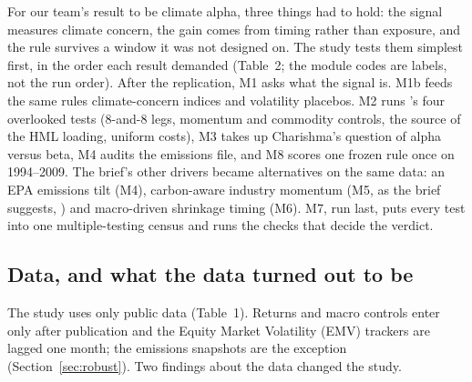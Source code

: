 For our team's result to be climate alpha, three things had to hold: the signal measures climate concern, the gain comes from timing rather than exposure, and the rule survives a window it was not designed on. The study tests them simplest first, in the order each result demanded (Table~2; the module codes are labels, not the run order). After the replication, M1 asks what the signal is. M1b feeds the same rules climate-concern indices and volatility placebos. M2 runs \CR's four overlooked tests (8-and-8 legs, momentum and commodity controls, the source of the HML loading, uniform costs), M3 takes up Charishma's question of alpha versus beta, M4 audits the emissions file, and M8 scores one frozen rule once on 1994--2009. The brief's other drivers became alternatives on the same data: an EPA emissions tilt (M4), carbon-aware industry momentum (M5, as the brief suggests, \citealp{za2024}) and macro-driven shrinkage timing (M6). M7, run last, puts every test into one multiple-testing census and runs the checks that decide the verdict.

\subsection{Data, and what the data turned out to be}
\label{sec:data}

The study uses only public data (Table~1). Returns and macro controls enter only after publication and the Equity Market Volatility (EMV) trackers are lagged one month; the emissions snapshots are the exception (Section~\ref{sec:robust}). Two findings about the data changed the study.

